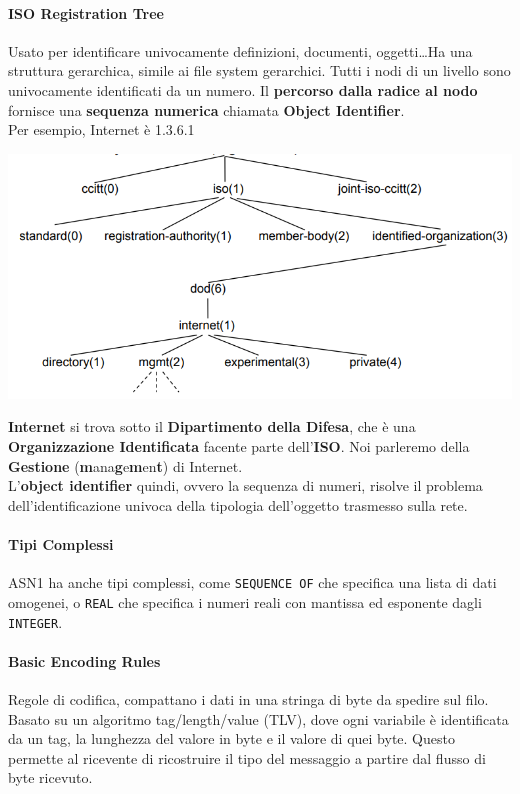 \documentclass[10pt]{book}
\begin{document}
\paragraph{ISO Registration Tree} Usato per identificare univocamente definizioni, documenti, oggetti\ldots Ha una struttura gerarchica, simile ai file system gerarchici. Tutti i nodi di un livello sono univocamente identificati da un numero. Il \textbf{percorso dalla radice al nodo} fornisce una \textbf{sequenza numerica} chiamata \textbf{Object Identifier}.\\
Per esempio, Internet è 1.3.6.1
\begin{center}
	\includegraphics[scale=0.7]{isotree.png}
\end{center}
\textbf{Internet} si trova sotto il \textbf{Dipartimento della Difesa}, che è una \textbf{Organizzazione Identificata} facente parte dell'\textbf{ISO}. Noi parleremo della \textbf{Gestione} (\textbf{m}ana\textbf{g}e\textbf{m}en\textbf{t}) di Internet.\\
L'\textbf{object identifier} quindi, ovvero la sequenza di numeri, risolve il problema dell'identificazione univoca della tipologia dell'oggetto trasmesso sulla rete.
\paragraph{Tipi Complessi} ASN1 ha anche tipi complessi, come \texttt{SEQUENCE OF} che specifica una lista di dati omogenei, o \texttt{REAL} che specifica i numeri reali con mantissa ed esponente dagli \texttt{INTEGER}.
\paragraph{Basic Encoding Rules} Regole di codifica, compattano i dati in una stringa di byte da spedire sul filo. Basato su un algoritmo tag/length/value (TLV), dove ogni variabile è identificata da un tag, la lunghezza del valore in byte e il valore di quei byte. Questo permette al ricevente di ricostruire il tipo del messaggio a partire dal flusso di byte ricevuto.
\end{document}
